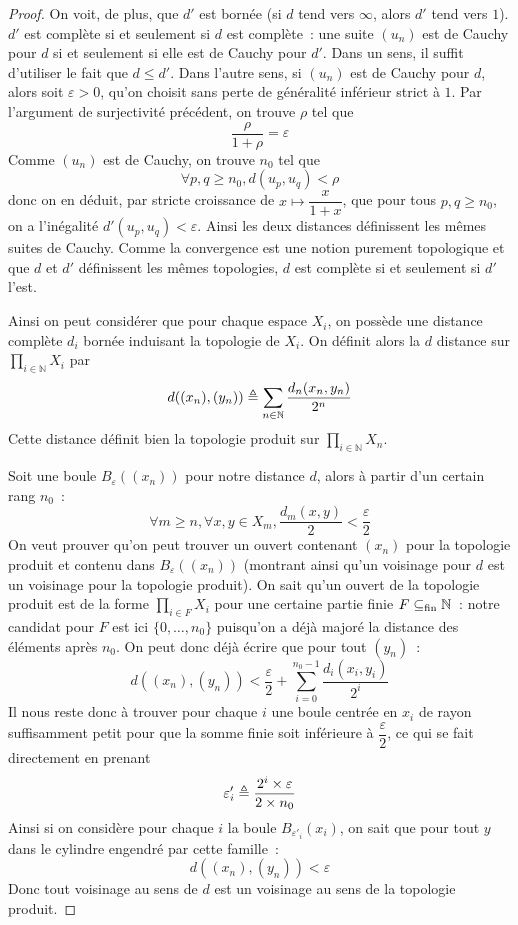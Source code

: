 \begin{proof}
  On voit, de plus, que $d'$ est bornée (si $d$ tend vers $\infty$, alors $d'$
  tend vers $1$). $d'$ est complète si et seulement si $d$ est complète~:
  une suite $(u_n)$ est de Cauchy pour $d$ si et seulement si elle est de
  Cauchy pour $d'$. Dans un sens, il suffit d'utiliser le fait que
  $d \leq d'$. Dans l'autre sens, si $(u_n)$ est de Cauchy pour
  $d$, alors soit $\varepsilon > 0$, qu'on choisit sans perte de généralité
  inférieur strict à $1$. Par l'argument de surjectivité précédent, on trouve
  $\rho$ tel que
  \[\frac{\rho}{1 + \rho} = \varepsilon\]
  Comme $(u_n)$ est de Cauchy, on trouve $n_0$ tel que
  \[\forall p,q \geq n_0, d(u_p,u_q) < \rho\]
  donc on en déduit, par stricte croissance de $x\mapsto \dfrac{x}{1 + x}$,
  que pour tous $p,q \geq n_0$, on a l'inégalité $d'(u_p,u_q) < \varepsilon$.
  Ainsi les deux distances définissent les mêmes suites de Cauchy. Comme la
  convergence est une notion purement topologique et que $d$ et $d'$
  définissent les mêmes topologies, $d$ est complète si et seulement si $d'$
  l'est.

  Ainsi on peut considérer que pour chaque espace $X_i$, on possède une
  distance complète $d_i$ bornée induisant la topologie de $X_i$. On définit
  alors la $d$ distance sur $\displaystyle\prod_{i\in\mathbb N} X_i$ par
  \[d((x_n),(y_n)) \triangleq \sum_{n \in \mathbb N} \frac{d_n(x_n,y_n)}{2^n}\]
  Cette distance définit bien la topologie produit sur
  $\displaystyle\prod_{i\in\mathbb N} X_n$.

  Soit une boule $B_\varepsilon((x_n))$ pour notre distance $d$, alors à partir
  d'un certain rang $n_0$~:
  \[\forall m \geq n, \forall x,y \in X_m,
  \frac{d_m(x,y)}{2} < \frac{\varepsilon}{2}\]
  On veut prouver qu'on peut trouver un ouvert contenant $(x_n)$ pour la
  topologie produit et contenu dans $B_\varepsilon((x_n))$ (montrant ainsi qu'un
  voisinage pour $d$ est un voisinage pour la topologie produit). On sait qu'un
  ouvert de la topologie produit est de la forme
  $\displaystyle\prod_{i \in F} X_i$ pour une certaine partie finie
  $F\subseteq_{\mathrm{fin}} \mathbb N$~: notre candidat pour $F$ est ici $\{0,\ldots,n_0\}$
  puisqu'on a déjà majoré la distance des éléments après $n_0$. On peut donc
  déjà écrire que pour tout $(y_n)$~:
  \[d((x_n),(y_n)) < \frac{\varepsilon}{2} +
  \sum_{i = 0}^{n_0 - 1} \frac{d_i(x_i,y_i)}{2^i}\]
  Il nous reste donc à trouver pour chaque $i$ une boule centrée en
  $x_i$ de rayon suffisamment petit pour que la somme finie soit inférieure à
  $\dfrac{\varepsilon}{2}$, ce qui se fait directement en prenant
  \[\varepsilon'_i \triangleq \frac{2^i\times \varepsilon}{2 \times n_0}\]
  Ainsi si on considère pour chaque $i$ la boule $B_{\varepsilon'_i}(x_i)$, on
  sait que pour tout $y$ dans le cylindre engendré par cette famille~:
  \[d((x_n),(y_n)) < \varepsilon\]
  Donc tout voisinage au sens de $d$ est un voisinage au sens de la topologie
  produit.


\end{proof}
